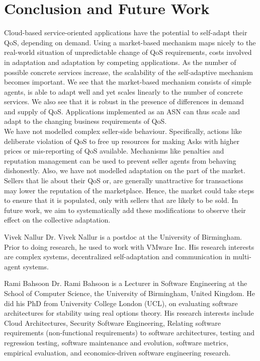 \documentclass[10pt,journal,compsoc]{IEEEtran}
\begin{document}
\section{Conclusion and Future Work}
Cloud-based service-oriented applications have the potential to self-adapt their QoS, depending on demand. Using a market-based mechanism maps nicely to the real-world situation of unpredictable change of QoS requirements, costs involved in adaptation and adaptation by competing applications. As the number of possible concrete services increase, the scalability of the self-adaptive mechanism becomes important. We see that the market-based mechanism consists of simple agents, is able to adapt well and yet scales linearly to the number of concrete services. We also see that it is robust in the presence of differences in demand and supply of QoS. Applications implemented as an ASN can thus scale and adapt to the changing business requirements of QoS.\\
We have not modelled complex seller-side behaviour. Specifically, actions like deliberate violation of QoS to free up resources for making Asks with higher prices or mis-reporting of QoS available. Mechanisms like penalties and reputation management can be used to prevent seller agents from behaving dishonestly. Also, we have not modelled adaptation on the part of the market. Sellers that lie about their QoS or, are generally unattractive for transactions may lower the reputation of the marketplace. Hence, the market could take steps to ensure that it is populated, only with sellers that are likely to be sold. In future work, we aim to systematically add these modifications to observe their effect on the collective adaptation. \\
  



\begin{IEEEbiographynophoto}{Vivek Nallur}
Dr. Vivek Nallur is a postdoc at the University of Birmingham. Prior to doing research, he used to work with VMware Inc. His research interests are complex systems, decentralized self-adaptation and communication in multi-agent systems.
\end{IEEEbiographynophoto}

\begin{IEEEbiographynophoto}{Rami Bahsoon}
Dr. Rami Bahsoon is a Lecturer in Software Engineering at the School of Computer Science, the University of Birmingham, United Kingdom. He did his PhD from University College London (UCL), on evaluating software architectures for stability using real options theory. His research interests include Cloud Architectures, Security Software Engineering, Relating software requirements (non-functional requirements) to software architectures, testing and regression testing, software maintenance and evolution, software metrics, empirical evaluation, and economics-driven software engineering research.  
\end{IEEEbiographynophoto}
\end{document}
